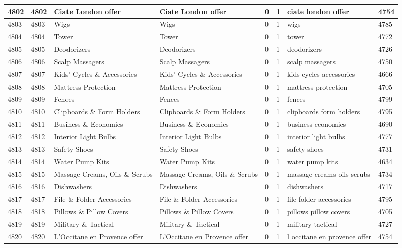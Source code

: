 \begin{longtable}{|l|l|l|l|l|l|l|l|}
4802 & 4802 & Ciate London offer & Ciate London offer & 0 & 1 & ciate london offer & 4754 \\ \hline 
4803 & 4803 & Wigs & Wigs & 0 & 1 & wigs & 4785 \\ \hline 
4804 & 4804 & Tower & Tower & 0 & 1 & tower & 4772 \\ \hline 
4805 & 4805 & Deodorizers & Deodorizers & 0 & 1 & deodorizers & 4726 \\ \hline 
4806 & 4806 & Scalp Massagers & Scalp Massagers & 0 & 1 & scalp massagers & 4750 \\ \hline 
4807 & 4807 & Kids' Cycles \& Accessories & Kids' Cycles \& Accessories & 0 & 1 & kids cycles accessories & 4666 \\ \hline 
4808 & 4808 & Mattress Protection & Mattress Protection & 0 & 1 & mattress protection & 4705 \\ \hline 
4809 & 4809 & Fences & Fences & 0 & 1 & fences & 4799 \\ \hline 
4810 & 4810 & Clipboards \& Form Holders & Clipboards \& Form Holders & 0 & 1 & clipboards form holders & 4795 \\ \hline 
4811 & 4811 & Business \& Economics & Business \& Economics & 0 & 1 & business economics & 4690 \\ \hline 
4812 & 4812 & Interior Light Bulbs & Interior Light Bulbs & 0 & 1 & interior light bulbs & 4777 \\ \hline 
4813 & 4813 & Safety Shoes & Safety Shoes & 0 & 1 & safety shoes & 4731 \\ \hline 
4814 & 4814 & Water Pump Kits & Water Pump Kits & 0 & 1 & water pump kits & 4634 \\ \hline 
4815 & 4815 & Massage Creams, Oils \& Scrubs & Massage Creams, Oils \& Scrubs & 0 & 1 & massage creams oils scrubs & 4734 \\ \hline 
4816 & 4816 & Dishwashers & Dishwashers & 0 & 1 & dishwashers & 4717 \\ \hline 
4817 & 4817 & File \& Folder Accessories & File \& Folder Accessories & 0 & 1 & file folder accessories & 4795 \\ \hline 
4818 & 4818 & Pillows \& Pillow Covers & Pillows \& Pillow Covers & 0 & 1 & pillows pillow covers & 4705 \\ \hline 
4819 & 4819 & Military \& Tactical & Military \& Tactical & 0 & 1 & military tactical & 4727 \\ \hline 
4820 & 4820 & L'Occitane en Provence offer & L'Occitane en Provence offer & 0 & 1 & l occitane en provence offer & 4754 \\ \hline 

\end{longtable}
